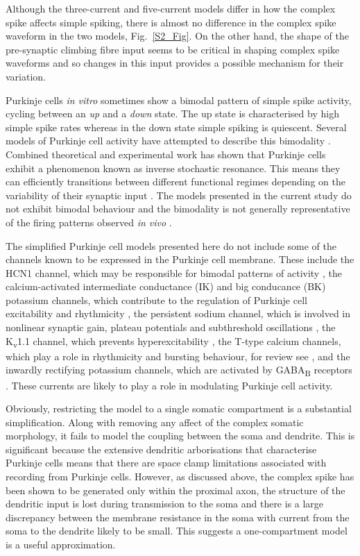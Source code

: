 \documentclass[twocolumn]{svjour3}          %
\begin{document}
Although the three-current and five-current models differ in how the
complex spike affects simple spiking, there is almost no difference in
the complex spike waveform in the two models, Fig.~\ref{S2_Fig}. On
the other hand, the shape of the pre-synaptic climbing fibre input
seems to be critical in shaping complex spike waveforms and so changes
in this input provides a possible mechanism for their variation.

Purkinje cells \textsl{in vitro} sometimes show a bimodal pattern of
simple spike activity, cycling between an \textsl{up} and a
\textsl{down} state. The up state is characterised by high simple
spike rates whereas in the down state simple spiking is
quiescent. Several models of Purkinje cell activity have attempted to
describe this bimodality
\citep{Forrest2014,ForrestEtAl2012,LlinasSugimori1980b,LoewensteinEtAl2005,McKayEtAl2007,WilliamsEtAl2002}. Combined theoretical and experimental work has shown that Purkinje cells exhibit a phenomenon known as inverse stochastic resonance. This means they can efficiently transitions between different functional regimes depending on the variability of their synaptic input \citep{buchin2016inverse}. The
models presented in the current study do not exhibit bimodal behaviour and the
bimodality is not generally representative of the firing patterns
observed \textsl{in vivo}
\citep{CerminaraRawson2004,McKayEtAl2007,SchonewilleEtAl2006}.

The simplified Purkinje cell models presented here do not include some
of the channels known to be expressed in the Purkinje cell
membrane. These include the HCN1 channel, which may be responsible for
bimodal patterns of activity \citep{LoewensteinEtAl2005}, the
calcium-activated intermediate conductance (IK) and big conducance
(BK) potassium channels, which contribute to the regulation of
Purkinje cell excitability and rhythmicity \citep{CheronEtAl2009}, the
persistent sodium channel, which is involved in nonlinear synaptic
gain, plateau potentials and subthreshold oscillations
\citep{KayEtAl1998}, the K\textsubscript{v}1.1 channel, which prevents
hyperexcitability \citep{ZhangEtAl1999}, the T-type calcium channels,
which play a role in rhythmicity and bursting behaviour, for review
see \citet{CainSnutch2010}, and the inwardly rectifying potassium
channels, which are activated by GABA\textsubscript{B} receptors
\citep{TabataEtAl2005}. These currents are likely to play a role in
modulating Purkinje cell activity.

Obviously, restricting the model to a single somatic compartment is a
substantial simplification. Along with removing any affect of the
complex somatic morphology, it fails to model the coupling between the
soma and dendrite. This is significant because the extensive dendritic
arborisations that characterise Purkinje cells means that there are
space clamp limitations associated with recording from Purkinje
cells. However, as discussed above, the complex spike has been shown
to be generated only within the proximal axon, the structure of the
dendritic input is lost during transmission to the soma and there is a
large discrepancy between the membrane resistance in the soma with
current from the soma to the dendrite likely to be small. This
suggests a one-compartment model is a useful approximation.
\end{document}
